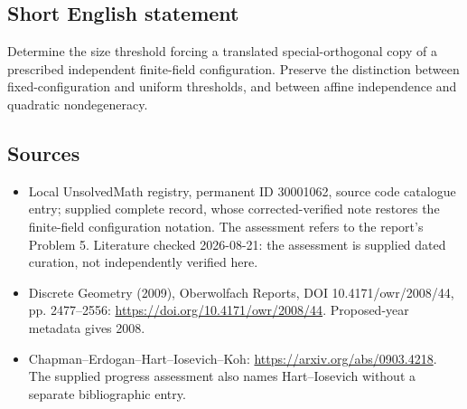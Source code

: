 \documentclass[11pt]{article}
\begin{document}
\subsection{Short English statement}
Determine the size threshold forcing a translated special-orthogonal copy of a prescribed independent finite-field configuration. Preserve the distinction between fixed-configuration and uniform thresholds, and between affine independence and quadratic nondegeneracy.
\subsection{Sources}
\begin{itemize}
\item Local UnsolvedMath registry, permanent ID 30001062, source code catalogue entry; supplied complete record, whose corrected-verified note restores the finite-field configuration notation. The assessment refers to the report's Problem 5. Literature checked 2026-08-21: the assessment is supplied dated curation, not independently verified here.
\item Discrete Geometry (2009), Oberwolfach Reports, DOI 10.4171/owr/2008/44, pp. 2477--2556: \url{https://doi.org/10.4171/owr/2008/44}. Proposed-year metadata gives 2008.
\item Chapman--Erdogan--Hart--Iosevich--Koh: \url{https://arxiv.org/abs/0903.4218}. The supplied progress assessment also names Hart--Iosevich without a separate bibliographic entry.
\end{itemize}
\end{document}
